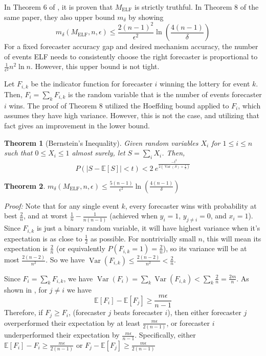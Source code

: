 \documentclass[letterpaper,12pt]{article}
\DeclareMathOperator*{\Var}{Var}
\newcommand{\E}{\mathbb{E}}
\newcommand{\1}{\mathbbm{1}}
\newcommand{\elf}{M_{\mathrm{ELF}}}
\newtheorem{theorem}{Theorem}
\begin{document}
In Theorem 6 of \cite{witkowski2018incentive}, it is proven that $\elf$ is strictly truthful. In Theorem 8 of the same paper, they also upper bound $m_\delta$ by showing 
\[ m_\delta(\elf, n, \epsilon) \leq \frac{2(n-1)^2}{\epsilon^2} \ln \left(\frac{4(n-1)}{\delta}\right)\]
For a fixed forecaster accuracy gap and desired mechanism accuracy, the number of events ELF needs to consistently choose the right forecaster is proportional to $\frac{1}{\epsilon^2} n^2 \ln n$. However, this upper bound is not tight. 

Let $F_{i, k}$ be the indicator function for forecaster $i$ winning the lottery for event $k$. Then, $F_i = \sum_k F_{i, k}$ is the random variable that is the number of events forecaster $i$ wins. The proof of Theorem 8 \cite{witkowski2018incentive} utilized the Hoeffding bound applied to $F_i$, which assumes they have high variance. However, this is not the case, and utilizing that fact gives an improvement in the lower bound. 
\begin{theorem}[Bernstein's Inequality]
  \label{bernstein}
  Given random variables $X_i$ for $1 \leq i \leq n$ such that $0 \leq X_i \leq 1$ almost surely, let $S = \sum_i X_i$. Then,
  \[ P\left(|S - \E[S]| < t\right) < 2 \: e^{\frac{-t^2 }{2\left(\Var(S) + \frac{t}{3}\right)} } \]
\end{theorem}
\begin{theorem}
  \label{elf_bound}
    $m_\delta(\elf, n, \epsilon) \leq \frac{5(n-1)}{\epsilon^2}\ln\left(\frac{4(n-1)}{\delta}\right)$
\end{theorem}
\emph{Proof:} Note that for any single event $k$, every forecaster wins with probability at best $\frac{2}{n}$, and at worst $\frac{1}{n} - \frac{1}{n(n-1)}$ (achieved when $y_i = 1$, $y_{j\neq i} = 0$, and $x_i = 1$). Since $F_{i, k}$ is just a binary random variable, it will have highest variance when it's expectation is as close to $\frac{1}{2}$ as possible. For nontrivially small $n$, this will mean its expectation is $\frac{2}{n}$ (or equivalently $P(F_{i, k} = 1) = \frac{2}{n}$), so its variance will be at most $\frac{2(n-2)}{n^2}$. So we have $\Var(F_{i, k}) \leq \frac{2(n-2)}{n^2} < \frac{2}{n}$. 

Since $F_i = \sum_k F_{i, k}$, we have $\Var(F_i) = \sum_k \Var(F_{i, k}) < \sum_k \frac{2}{n} = \frac{2m}{n}$. As shown in \citet{witkowski2018incentive}, for $j\neq i$ we have 
\[ \E[F_i] - \E[F_j] \geq \frac{m \epsilon}{n - 1}\]
Therefore, if $F_j \geq F_i$, (forecaster $j$ beats forecaster $i$), then either forecaster $j$ overperformed their expectation by at least $\frac{m \epsilon}{2(n - 1)}$, or forecaster $i$ underperformed their expectation by $\frac{m \epsilon}{n - 1}$. Specifically, either $\E[F_i] - F_i \geq \frac{m \epsilon}{2(n - 1)}$ or $F_j - \E[F_j] \geq \frac{m \epsilon}{2(n - 1)}$
\end{document}

